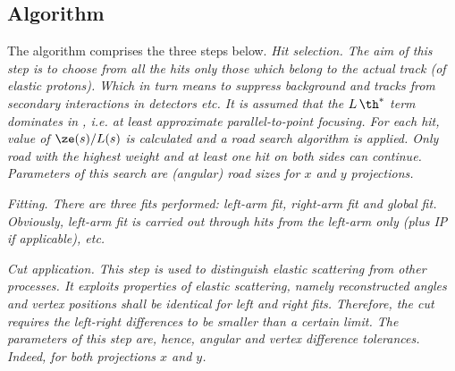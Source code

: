 \iffalse
In case of symmetric optic, i.e.
$$L(-s) = - L(s),\qquad v(-s) = v(s)\eqno(3)$$
and symmetric measurement (simultaneously at $\pm 216$ and/or $\pm220$) one gets condition $\sum Lv = 0$. It simplifies the general formula (2) to
$$\pmatrix{\ze^*\cr\th^*} = \pmatrix{\sum \ze v / \sum v^2\cr \sum \ze L / \sum L^2}.\eqno{(4)}$$
The expression for $\th^*$ can be further expanded
$$\th^* = {1\over 2} {L(216) \big(\ze(216) - \ze(-216)\big)\ +\ L(220)\big( \ze(220) - \ze(-220) \big) \over L^2(216) + L^2(220)}\eqno{(5)}$$
\fi

\subsection[algo]{Algorithm}

The algorithm comprises the three steps below.
\bitm
\itm \em{Hit selection}. The aim of this step is to choose from all the hits only those which belong to the actual track (of elastic protons). Which in turn means to suppress background and tracks from secondary interactions in detectors etc. It is assumed that the $L\,\th^*$ term dominates in , i.e\hbox{.} at least approximate parallel-to-point focusing. For each hit, value of $\ze(s) / L(s)$ is calculated and a road search algorithm is applied. Only road with the highest weight and at least one hit on both sides can continue. Parameters of this search are (angular) road sizes for $x$ and $y$ projections.


\itm \em{Fitting}. There are three fits performed: left-arm fit, right-arm fit and global fit. Obviously, left-arm fit is carried out through hits from the left-arm only (plus IP if applicable), etc.

\itm \em{Cut application}. This step is used to distinguish elastic scattering from other processes. It exploits properties of elastic scattering, namely reconstructed angles and vertex positions shall be identical for left and right fits. Therefore, the cut requires the left-right differences to be smaller than a certain limit. The parameters of this step are, hence, angular and vertex difference tolerances. Indeed, for both projections $x$ and $y$.
\eitm

